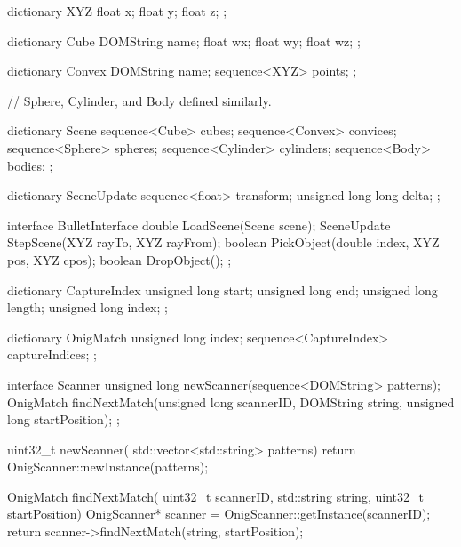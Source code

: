 \begin{code}
dictionary XYZ{
	float x;
	float y;
	float z;
};

dictionary Cube{
	DOMString name;
	float wx;
	float wy;
	float wz;
};

dictionary Convex{
	DOMString name;
	sequence<XYZ> points;
};

// Sphere, Cylinder, and Body  defined similarly.

dictionary Scene{
	sequence<Cube> cubes;
	sequence<Convex> convices;
	sequence<Sphere> spheres;
	sequence<Cylinder> cylinders;
	sequence<Body> bodies;
};

dictionary SceneUpdate{
	sequence<float> transform;
	unsigned long long delta;	
};

interface BulletInterface {
	double LoadScene(Scene scene);
	SceneUpdate StepScene(XYZ rayTo, XYZ rayFrom);
	boolean PickObject(double index, XYZ pos, XYZ cpos);
	boolean DropObject();
};
\end{code}


\begin{code}
dictionary CaptureIndex{
	unsigned long start;
	unsigned long end;
	unsigned long length;
	unsigned long index;
};

dictionary OnigMatch{
	unsigned long index;
	sequence<CaptureIndex> captureIndices;
};

interface Scanner{
	unsigned long newScanner(sequence<DOMString> patterns);
	OnigMatch findNextMatch(unsigned long scannerID, DOMString string,
	                                     unsigned long startPosition);
};
\end{code}

\begin{code}
uint32_t newScanner( std::vector<std::string> patterns){
        return OnigScanner::newInstance(patterns);
}

OnigMatch findNextMatch( uint32_t scannerID,  std::string string,  
                                              uint32_t startPosition){
        OnigScanner* scanner = OnigScanner::getInstance(scannerID);
        return scanner->findNextMatch(string, startPosition);
}
\end{code}
\newpage
